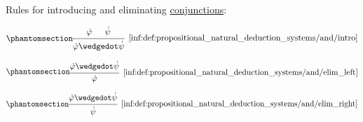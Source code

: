 \begin{definition}
\begin{thmenum}
     Rules for introducing and eliminating \hyperref[def:propositional_alphabet/connectives/conjunction]{conjunctions}:
    \begin{paracol}{3}
      \begin{nthcolumn}{0}
        \ParacolAlignmentHack
        \begin{equation*}\taglabel[\ensuremath{ \wedge_+ }]{inf:def:propositional_natural_deduction_systems/and/intro}
          \begin{prooftree}
            \hypo{ \syn\varphi }
            \hypo{ \syn\psi }
            \infer2[\ref{inf:def:propositional_natural_deduction_systems/and/intro}]{ \syn\varphi \synwedge \syn\psi }
          \end{prooftree}
        \end{equation*}
      \end{nthcolumn}

      \begin{nthcolumn}{1}
        \ParacolAlignmentHack
        \begin{equation*}\taglabel[\ensuremath{ \wedge_{-L} }]{inf:def:propositional_natural_deduction_systems/and/elim_left}
          \begin{prooftree}
            \hypo{ \syn\varphi \synwedge \syn\psi }
            \infer1[\ref{inf:def:propositional_natural_deduction_systems/and/elim_left}]{ \syn\varphi }
          \end{prooftree}
        \end{equation*}
      \end{nthcolumn}

      \begin{nthcolumn}{2}
        \ParacolAlignmentHack
        \begin{equation*}\taglabel[\ensuremath{ \wedge_{-R} }]{inf:def:propositional_natural_deduction_systems/and/elim_right}
          \begin{prooftree}
            \hypo{ \syn\varphi \synwedge \syn\psi }
            \infer1[\ref{inf:def:propositional_natural_deduction_systems/and/elim_right}]{ \syn\psi }
          \end{prooftree}
        \end{equation*}
      \end{nthcolumn}
    \end{paracol}


\end{thmenum}
\end{definition}
